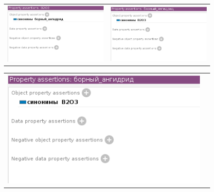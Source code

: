 \documentclass[a4paper]{article}
\begin{document}
\begin{landscape}
\begin{figure}[t]
  \end{figure}
  \begin{figure}
  \centering
  \begin{tabular}{cc}
  \includegraphics[scale=0.75]{./Source/protege/B2O3.png}
  &
  \includegraphics[scale=1.0]{./Source/protege/born_ang.png}
  \end{tabular} 
  \end{figure}
\newpage
  \begin{figure}
  \centering
  \begin{tabular}{cc}
  \includegraphics[scale=0.75]{./Source/protege/born_ang.png}
  &

\end{tabular}
\end{figure}
\end{landscape}
\end{document}
